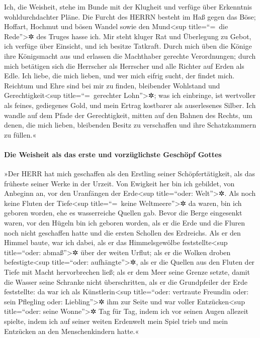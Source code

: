 Ich, die Weisheit, stehe im Bunde mit der Klugheit und
verfüge über Erkenntnis wohldurchdachter Pläne. Die
Furcht des HERRN besteht im Haß gegen das Böse; Hoffart, Hochmut und
bösen Wandel sowie den Mund\textless sup title=``=~die
Rede''\textgreater✲ des Truges hasse ich. Mir steht
kluger Rat und Überlegung zu Gebot, ich verfüge über Einsicht, und ich
besitze Tatkraft. Durch mich üben die Könige ihre
Königsmacht aus und erlassen die Machthaber gerechte Verordnungen;
durch mich betätigen sich die Herrscher als Herrscher und
alle Richter auf Erden als Edle. Ich liebe, die mich
lieben, und wer mich eifrig sucht, der findet mich.
Reichtum und Ehre sind bei mir zu finden, bleibender
Wohlstand und Gerechtigkeit\textless sup title=``=~gerechter
Lohn''\textgreater✲; was ich einbringe, ist wertvoller
als feines, gediegenes Gold, und mein Ertrag kostbarer als auserlesenes
Silber. Ich wandle auf dem Pfade der Gerechtigkeit,
mitten auf den Bahnen des Rechts, um denen, die mich
lieben, bleibenden Besitz zu verschaffen und ihre Schatzkammern zu
füllen.«

\hypertarget{die-weisheit-als-das-erste-und-vorzuxfcglichste-geschuxf6pf-gottes}{%
\paragraph{Die Weisheit als das erste und vorzüglichste Geschöpf
Gottes}\label{die-weisheit-als-das-erste-und-vorzuxfcglichste-geschuxf6pf-gottes}}

»Der HERR hat mich geschaffen als den Erstling seiner
Schöpfertätigkeit, als das früheste seiner Werke in der Urzeit.
Von Ewigkeit her bin ich gebildet, von Anbeginn an, vor
den Uranfängen der Erde\textless sup title=``oder: Welt''\textgreater✲.
Als noch keine Fluten der Tiefe\textless sup
title=``=~keine Weltmeere''\textgreater✲ da waren, bin ich geboren
worden, ehe es wasserreiche Quellen gab. Bevor die Berge
eingesenkt waren, vor den Hügeln bin ich geboren worden,
als er die Erde und die Fluren noch nicht geschaffen
hatte und die ersten Schollen des Erdreichs. Als er den
Himmel baute, war ich dabei, als er das Himmelsgewölbe
feststellte\textless sup title=``oder: abmaß''\textgreater✲ über der
weiten Urflut; als er die Wolken droben
befestigte\textless sup title=``oder: aufhängte''\textgreater✲, als er
die Quellen aus den Fluten der Tiefe mit Macht hervorbrechen ließ;
als er dem Meer seine Grenze setzte, damit die Wasser
seine Schranke nicht überschritten, als er die Grundpfeiler der Erde
feststellte: da war ich als Künstlerin\textless sup
title=``oder: vertraute Freundin oder: sein Pflegling oder:
Liebling''\textgreater✲ ihm zur Seite und war voller
Entzücken\textless sup title=``oder: seine Wonne''\textgreater✲ Tag für
Tag, indem ich vor seinen Augen allezeit spielte, indem
ich auf seiner weiten Erdenwelt mein Spiel trieb und mein Entzücken an
den Menschenkindern hatte.«

